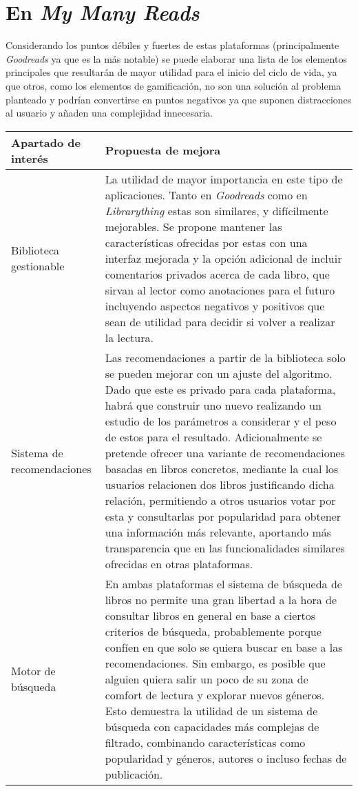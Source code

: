 \section{En \textit{My Many Reads}}

Considerando los puntos débiles y fuertes de estas plataformas (principalmente \textit{Goodreads} ya que es la más notable) se puede elaborar una lista de los elementos principales que resultarán de mayor utilidad para el inicio del ciclo de vida, ya que otros, como los elementos de gamificación, no son una solución al problema planteado y podrían convertirse en puntos negativos ya que suponen distracciones al usuario y añaden una complejidad innecesaria.

\begin{table}[H]
    \begin{tabularx}{\linewidth}{|X|X|}
        \hline
        \textbf{Apartado de interés} & \textbf{Propuesta de mejora} \\
        \hline
        Biblioteca gestionable     & La utilidad de mayor importancia en este tipo de aplicaciones. Tanto en \textit{Goodreads} como en \textit{Librarything} estas son similares, y difícilmente mejorables. Se propone mantener las características ofrecidas por estas con una interfaz mejorada y la opción adicional de incluir comentarios privados acerca de cada libro, que sirvan al lector como anotaciones para el futuro incluyendo aspectos negativos y positivos que sean de utilidad para decidir si volver a realizar la lectura. \\ 
        \hline
        Sistema de recomendaciones & Las recomendaciones a partir de la biblioteca solo se pueden mejorar con un ajuste del algoritmo. Dado que este es privado para cada plataforma, habrá que construir uno nuevo realizando un estudio de los parámetros a considerar y el peso de estos para el resultado. Adicionalmente se pretende ofrecer una variante de recomendaciones basadas en libros concretos, mediante la cual los usuarios relacionen dos libros justificando dicha relación, permitiendo a otros usuarios votar por esta y consultarlas por popularidad para obtener una información más relevante, aportando más transparencia que en las funcionalidades similares ofrecidas en otras plataformas. \\ 
        \hline
        Motor de búsqueda   & En ambas plataformas el sistema de búsqueda de libros no permite una gran libertad a la hora de consultar libros en general en base a ciertos criterios de búsqueda, probablemente porque confíen en que solo se quiera buscar en base a las recomendaciones. Sin embargo, es posible que alguien quiera salir un poco de su zona de comfort de lectura y explorar nuevos géneros. Esto demuestra la utilidad de un sistema de búsqueda con capacidades más complejas de filtrado, combinando características como popularidad y géneros, autores o incluso fechas de publicación. \\ 
        \hline
    \end{tabularx}
\end{table}